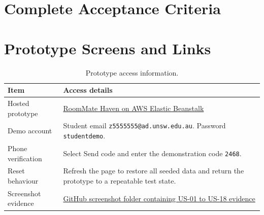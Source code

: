 \documentclass[11pt,a4paper]{article}
\begin{document}
\clearpage
\section{Complete Acceptance Criteria}
\label{appfullacceptance}



\section{Prototype Screens and Links}

\begin{table}[H]
    \centering
    \small
    \caption{Prototype access information.}
    \begin{tabularx}{\textwidth}{@{}L{3.4cm}Y@{}}
        \toprule
        Item & Access details\\
        \midrule
        Hosted prototype & \href{http://roommate-haven-dev.eba-2h6p4mxq.ap-southeast-2.elasticbeanstalk.com}{RoomMate Haven on AWS Elastic Beanstalk}\\
        Demo account & Student email \texttt{z5555555@ad.unsw.edu.au}. Password \texttt{studentdemo}.\\
        Phone verification & Select Send code and enter the demonstration code \texttt{2468}.\\
        Reset behaviour & Refresh the page to restore all seeded data and return the prototype to a repeatable test state.\\
        Screenshot evidence & \href{https://github.com/NuodiLiu/DESN2000/tree/main/part2/user_story_screenshots}{GitHub screenshot folder containing US-01 to US-18 evidence}\\
        \bottomrule
    \end{tabularx}
    \label{tabprototypeaccess}
\end{table}
\end{document}
